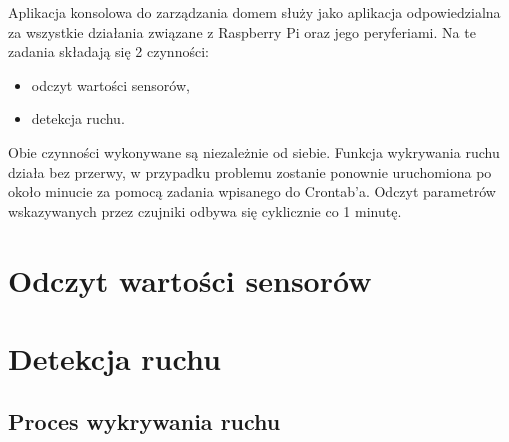 Aplikacja konsolowa do zarządzania domem służy jako aplikacja odpowiedzialna za wszystkie działania związane z Raspberry Pi oraz jego peryferiami. Na te zadania składają się 2 czynności:
\begin{itemize}
\item odczyt wartości sensorów,
\item detekcja ruchu.
\end{itemize}
Obie czynności wykonywane są niezależnie od siebie. Funkcja wykrywania ruchu działa bez przerwy, w przypadku problemu zostanie ponownie uruchomiona po około minucie za pomocą zadania wpisanego do Crontab'a. Odczyt parametrów wskazywanych przez czujniki odbywa się cyklicznie co 1 minutę.
\section{Odczyt wartości sensorów}

\section{Detekcja ruchu}

\subsection{Proces wykrywania ruchu}